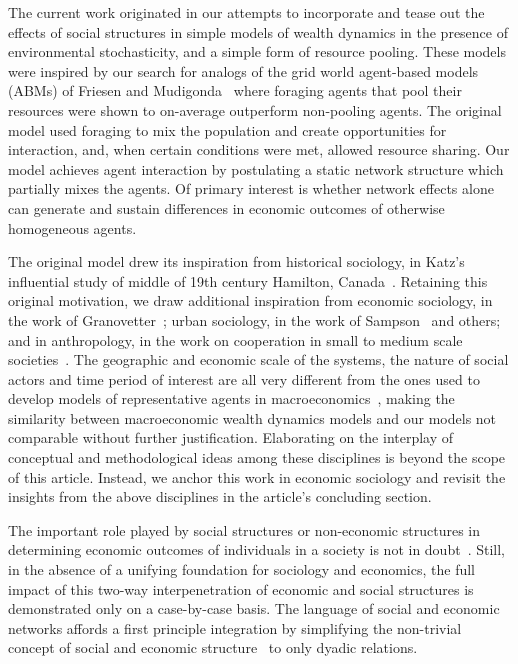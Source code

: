 \documentclass[sigconf]{acmart}
\begin{document}
The current work originated in our attempts to incorporate and tease out the effects of social structures in simple models of wealth dynamics in the presence of environmental stochasticity, and a simple form of resource pooling. These models were inspired by our search for analogs of the grid world agent-based models (ABMs) of Friesen and Mudigonda~\cite{srimil} where foraging agents that pool their resources were shown to on-average outperform non-pooling agents. The original model used foraging to mix the population and create opportunities for interaction, and, when certain conditions were met, allowed resource sharing. Our model achieves agent interaction by postulating a static network structure which partially mixes the agents. Of primary interest is whether network effects alone can generate and sustain differences in economic outcomes of otherwise homogeneous agents.  

The original model drew its inspiration from historical sociology, in Katz's influential study of middle of 19th century Hamilton, Canada~\cite{katz2013people}. Retaining this original motivation, we draw additional inspiration from economic sociology, in the work of Granovetter~\cite{granovetter2005}; urban sociology, in the work of Sampson~\cite{sampson2002} and others; and in anthropology, in the work on cooperation in small to medium scale societies~\cite{avner1994,white2011kinship}. The geographic and economic scale of the systems, the nature of social actors and time period of interest are all very different from the ones used to develop models of representative agents in macroeconomics~\cite{benhabib2018}, making the similarity between macroeconomic wealth dynamics models and our models not comparable without further justification. Elaborating on the interplay of conceptual and methodological ideas among these disciplines is beyond the scope of this article. Instead, we anchor this work in economic sociology and revisit the insights from the above disciplines in the article's concluding section.

The important role played by social structures or non-economic structures in determining economic outcomes of individuals in a society is not in doubt~\cite{granovetter2005,jackson_rev2017}. Still, in the absence of a unifying foundation for sociology and economics, the full impact of this two-way interpenetration of economic and social structures is demonstrated only on a case-by-case basis. The language of social and economic networks affords a first principle integration by simplifying the non-trivial concept of social and economic structure~\cite{martin_lee} to only dyadic relations. 
\end{document}
